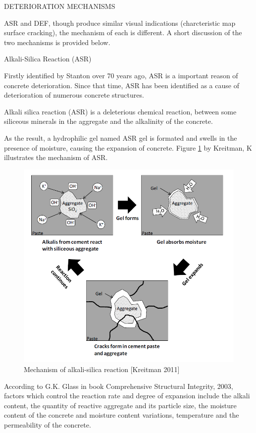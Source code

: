 DETERIORATION MECHANISMS

ASR and DEF, though produce similar visual indications (charcteristic map surface cracking), the mechanism of each is different. A short discussion of the two mechanisms is provided below.

Alkali-Silica Reaction (ASR)

Firstly identified by Stanton\cite{Stanton} over 70 years ago, ASR is a important reason of concrete deterioration. Since that time, ASR has been identified as a cause of deterioration of numerous concrete structures.


Alkali silica reaction (ASR) is a deleterious chemical reaction, between some siliceous minerals in the aggregate and the alkalinity of the concrete.

As the result, a hydrophilic gel named ASR gel is formated and swells in the presence of moisture, causing the expansion of concrete. Figure \ref{ASR_mechanism} by Kreitman, K\cite{Kreitman} illustrates the mechanism of ASR.


\begin{figure}[ht]
\centering
\includegraphics[width=.3\linewidth]{Reference/Kreitman.png}
  \caption{Mechanism of alkali-silica reaction [Kreitman 2011]}
  \label{ASR_mechanism}
\end{figure}

According to G.K. Glass\cite{G.K. Glass} in book Comprehensive Structural Integrity, 2003, factors which control the reaction rate and degree of expansion include the alkali content, the quantity of reactive aggregate and its particle size, the moisture content of the concrete and moisture content variations, temperature and the permeability of the concrete.

